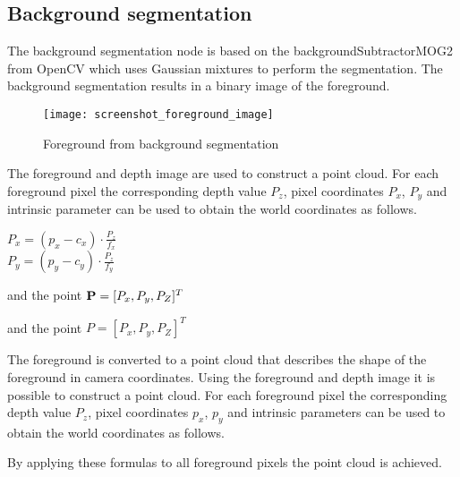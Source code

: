 
\subsection{Background segmentation}


The background segmentation node is based on the backgroundSubtractorMOG2 from OpenCV \cite{BGS} which uses Gaussian mixtures to perform the segmentation. The background segmentation results in a binary image of the foreground. 

\begin{figure}[H]
\begin{center}
\texttt{[image: screenshot\_foreground\_image]}
\caption{Foreground from background segmentation}

\end{center}
\end{figure}


The foreground and depth image are used to construct a point cloud. For each foreground pixel the corresponding depth value $P_z$, pixel coordinates $P_x$, $P_y$ and intrinsic parameter can be used to obtain the world coordinates as follows.

\begin{center}
$\displaystyle P_x = (p_x - c_x) \cdot \frac{P_z}{f_x}$\\ \vspace{10 pt}
$\displaystyle P_y = (p_y - c_y) \cdot \frac{P_z}{f_y}$
\end{center}
and the point ${\bf P} = [P_x, P_y, P_Z]^T$

and the point $P = [P_x, P_y, P_Z]^T$

The foreground is converted to a point cloud that describes the shape of the foreground in camera coordinates. Using the foreground and depth image it is possible to construct a point cloud. For each foreground pixel the corresponding depth value $P_z$, pixel coordinates $p_x$, $p_y$ and intrinsic parameters can be used to obtain the world coordinates as follows.


By applying these formulas to all foreground pixels the point cloud is achieved.


